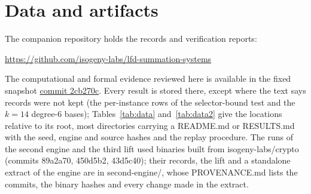 \documentclass[11pt]{article}
\theoremstyle{definition}\newtheorem{definition}[theorem]{Definition}
\theoremstyle{remark}\newtheorem{remark}[theorem]{Remark}
\newcommand{\codeus}{\textunderscore\allowbreak}
\newcommand{\code}[1]{{\ttfamily\let\_\codeus#1}}
\begin{document}
\section{Data and artifacts}\label{app:data}
The companion repository holds the records and verification reports:
\begin{center}
\url{https://github.com/isogeny-labs/lfd-summation-systems}
\end{center}
The computational and formal evidence reviewed here is available in the
fixed snapshot \href{https://github.com/isogeny-labs/lfd-summation-systems/tree/2cb270c}{commit \code{2cb270c}}.
Every result is stored there, except where the text says records were not
kept (the per-instance rows of the selector-bound test and the $k=14$
degree-$6$ bases); Tables~\ref{tab:data} and~\ref{tab:data2} give the
locations relative to its root, most directories carrying a \code{README.md}
or \code{RESULTS.md} with the seed, engine and source hashes and the replay
procedure. The runs of the second engine and the third lift used binaries
built from \code{isogeny-labs/crypto} (commits \code{89a2a70},
\code{450d5b2}, \code{43d5c40}); their records, the lift and a standalone
extract of the engine are in \code{second-engine/}, whose \code{PROVENANCE.md}
lists the commits, the binary hashes and every change made in the extract.
\end{document}
